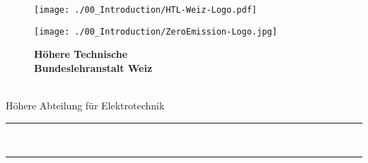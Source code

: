 \begin{titlingpage}
	\begin{figure}[h]
		\begin{minipage}{0.2\textwidth}
			\raggedright
			\texttt{[image: ./00\_Introduction/HTL-Weiz-Logo.pdf]}						%
		\end{minipage}
		\hfill
		\begin{minipage}{0.1\textwidth}
			\raggedleft
			\texttt{[image: ./00\_Introduction/ZeroEmission-Logo.jpg]}					%
		\end{minipage}
		\hfill
		\begin{center}
			\vspace{-1.5cm}
			\centering
			\large \textbf{Höhere Technische\\ Bundeslehranstalt Weiz}									%
		\end{center}
	\end{figure}
	
	\vspace{1cm}
	
	
	\begin{center} {}\\ \vspace{0.25cm} {\large Höhere Abteilung für Elektrotechnik}\\ \end{center}	%
	\noindent\rule{\textwidth}{0.4pt}
	\vspace{0.3cm}
	\begin{center} {\LARGE\textbf{\iLUName}}\\ \end{center}																							%
	\vspace{0.3cm}
	\noindent\rule{\textwidth}{0.4pt}
	

\end{titlingpage}
